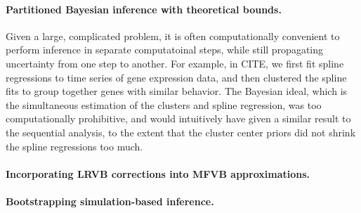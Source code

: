 \paragraph{Partitioned Bayesian inference with theoretical bounds.}

Given a large, complicated problem, it is often computationally convenient to
perform inference in separate computatoinal steps, while still propagating
uncertainty from one step to another.  For example, in CITE, we first fit spline
regressions to time series of gene expression data, and then clustered the
spline fits to group together genes with similar behavior.  The Bayesian ideal,
which is the simultaneous estimation of the clusters and spline regression, was
too computationally prohibitive, and would intuitively have given a similar
result to the sequential analysis, to the extent that the cluster center priors
did not shrink the spline regressions too much.


\paragraph{Incorporating LRVB corrections into MFVB approximations.}



\paragraph{Bootstrapping simulation-based inference.}

\citet{giordano2019:hoij}
\citet{efron:1994:bootstrap}
\citet{hall:2013:bootstrap}







